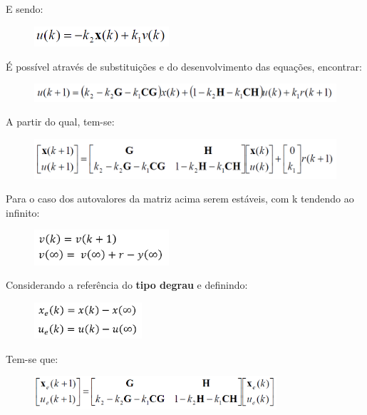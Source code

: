 \documentclass[a4paper,12pt]{article}
\begin{document}
E sendo:
\begin{figure}[H]
\centering
\includegraphics[width=5cm]{imagens-6/4.png}
\end{figure}


É possível através de substituições e do desenvolvimento das equações, encontrar:
\begin{figure}[H]
\centering
\includegraphics[width=12cm]{imagens-6/5.png}
\end{figure}


A partir do qual, tem-se:
\begin{figure}[H]
\centering
\includegraphics[width=12cm]{imagens-6/7.png}
\end{figure}


Para o caso dos autovalores da matriz acima serem estáveis, com  k tendendo ao infinito:
\begin{figure}[H]
\centering
\includegraphics[width=5cm]{imagens-6/14.png}
\end{figure}

\break


Considerando a referência do \textbf{tipo degrau} e definindo:
\begin{figure}[H]
\centering
\includegraphics[width=4cm]{imagens-6/15.png}
\end{figure}


Tem-se que:
\begin{figure}[H]
\centering
\includegraphics[width=9cm]{imagens-6/10.png}
\end{figure}
\end{document}
